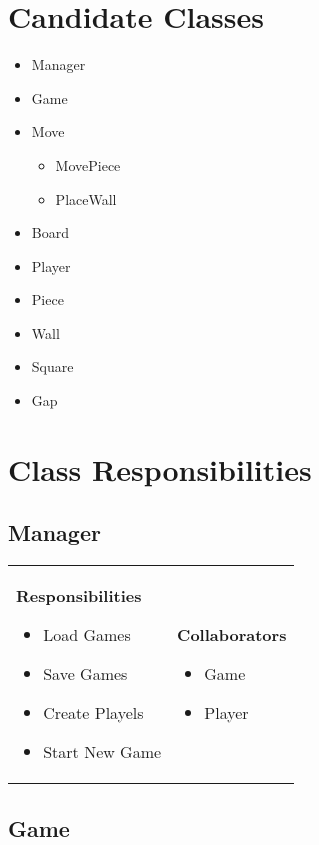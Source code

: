 \documentclass[a4paper]{article}
\begin{document}
\pagebreak

\section{Candidate Classes}
    \begin{itemize}
    \item Manager
    \item Game
    \item Move
        \begin{itemize}
        \item MovePiece
        \item PlaceWall
        \end{itemize}
    \item Board
    \item Player
    \item Piece
    \item Wall
    \item Square
    \item Gap
    \end{itemize}


\pagebreak
\section{Class Responsibilities}

\subsection*{Manager}

\begin{tabular}{p{9cm}p{3cm}}
    \textbf{Responsibilities}
    \begin{itemize}
    \item Load Games
    \item Save Games
    \item Create Playels
    \item Start New Game
    \end{itemize}
    &
    \textbf{Collaborators}
    \begin{itemize}
    \item Game
    \item Player
    \end{itemize}
\end{tabular}



\subsection*{Game}
\end{document}
